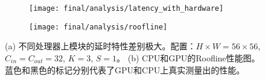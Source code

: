 \begin{figure}[ht]
    \centering
    \begin{subfigure}[b]{0.96\linewidth}
        \centering
        \texttt{[image: final/analysis/latency\_with\_hardware]}
    	\caption{\label{fig:latency_with_hardware}}
    \end{subfigure}
    \begin{subfigure}[b]{0.96\linewidth}
        \centering
        \texttt{[image: final/analysis/roofline]}
        \caption{\label{fig:roofline}}
    \end{subfigure}
    \caption{
        (a) 不同处理器上模块的延时特性差别极大。配置：$H\times W=56 \times 56$, $C_{in}=C_{out}=32$, $K=3$, $S=1$。
        (b) CPU和GPU的Roofline性能图。蓝色和黑色的标记分别代表了GPU和CPU上真实测量出的性能。
    }
\end{figure}